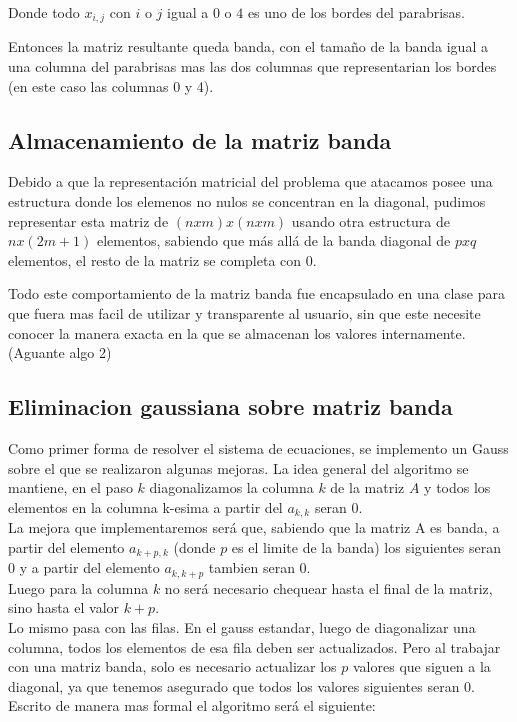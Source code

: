 Donde todo $x_{i,j}$ con $i$ o $j$ igual a $0$ o $4$ es uno de los bordes del parabrisas.

Entonces la matriz resultante queda banda, con el tamaño de la banda igual a una columna del parabrisas mas las dos columnas que representarian los bordes (en este caso las columnas 0 y 4).

\subsection{Almacenamiento de la matriz banda}

Debido a que la representaci\'on matricial del problema que atacamos posee una estructura donde los elemenos no nulos se concentran en la diagonal, pudimos representar esta matriz de $(nxm)x(nxm)$ usando otra estructura de $nx(2m+1)$ elementos, sabiendo que m\'as all\'a de la banda diagonal de $pxq$ elementos, el resto de la matriz se completa con 0.

Todo este comportamiento de la matriz banda fue encapsulado en una clase para que fuera mas facil de utilizar y transparente al usuario, sin que este necesite conocer la manera exacta en la que se almacenan los valores internamente. (Aguante algo 2)

\subsection{Eliminacion gaussiana sobre matriz banda}

Como primer forma de resolver el sistema de ecuaciones, se implemento un Gauss sobre el que se realizaron algunas mejoras. La idea general del algoritmo se mantiene, en el paso $k$ diagonalizamos la columna $k$ de la matriz $A$ y todos los elementos en la columna k-esima a partir del $a_{k,k}$ seran $0$.
\\
La mejora que implementaremos ser\'a que, sabiendo que la matriz A es banda, a partir del elemento $a_{k+p,k}$ (donde $p$ es el limite de la banda) los siguientes seran $0$ y a partir del elemento $a_{k,k+p}$ tambien seran $0$.
\\
Luego para la columna $k$ no ser\'a necesario chequear hasta el final de la matriz, sino hasta el valor $k+p$.
\\
Lo mismo pasa con las filas. En el gauss estandar, luego de diagonalizar una columna, todos los elementos de esa fila deben ser actualizados. Pero al trabajar con una matriz banda, solo es necesario actualizar los $p$ valores que siguen a la diagonal, ya que tenemos asegurado que todos los valores siguientes seran $0$.
\\
Escrito de manera mas formal el algoritmo ser\'a el siguiente:

